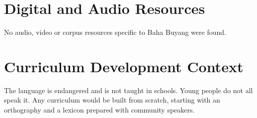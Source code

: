 \documentclass[12pt]{article}
\begin{document}
\section{Digital and Audio Resources}
No audio, video or corpus resources specific to Baha Buyang were found.

\section{Curriculum Development Context}
The language is endangered and is not taught in schools. Young people do not all speak it. Any curriculum would be built from scratch, starting with an orthography and a lexicon prepared with community speakers.
\end{document}
